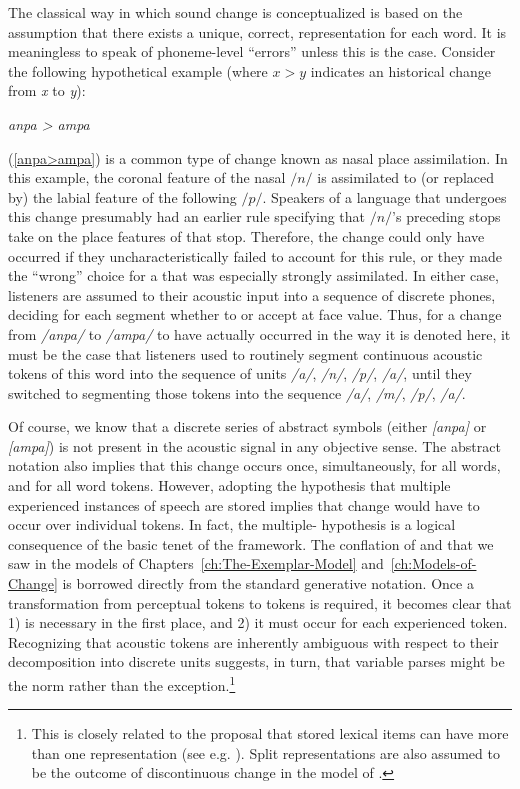 The classical way in which sound change is conceptualized is based
on the assumption that there exists a unique, correct, 
representation for each word. It is meaningless to speak of phoneme-level
“errors” unless this is the case. Consider the following hypothetical
example (where \emph{$x>y$} indicates an historical change from \emph{x}
to \emph{y}):
\begin{covexamples}
\item \label{anpa>ampa}\emph{anpa \textgreater{} ampa}
\end{covexamples}
(\ref{anpa>ampa}) is a common type of change known as nasal place
assimilation. In this example, the coronal feature of the nasal $/n/$
is assimilated to (or replaced by) the labial feature of the following
$/p/$. Speakers of a language that undergoes this change presumably
had an earlier  rule specifying that $/n/$'s preceding
stops take on the place features of that stop. Therefore, the change
could only have occurred if they uncharacteristically failed to account
for this rule, or they made the “wrong” choice for a 
that was especially strongly assimilated. In either case, listeners
are assumed to  their acoustic input into a sequence of discrete
phones, deciding for each segment whether to  or accept at
face value. Thus, for a change from \emph{/anpa/} to \emph{/ampa/}
to have actually occurred in the way it is denoted here, it must be
the case that listeners used to routinely segment continuous acoustic
tokens of this word into the sequence of units \emph{/a/}, \emph{/n/},
\emph{/p/}, \emph{/a/}, until they switched to segmenting
those tokens into the sequence \emph{/a/}, \emph{/m/}, \emph{/p/},
\emph{/a/}. 

Of course, we know that a discrete series of abstract symbols (either
\emph{[anpa]} or \emph{[ampa]}) is not present in the acoustic
signal in any objective sense. The abstract notation also implies
that this change occurs once, simultaneously, for all words, and for
all word tokens. However, adopting the hypothesis that multiple experienced
instances of speech are stored implies that change would have to occur
over individual tokens. In fact, the multiple- hypothesis is
a logical consequence of the basic tenet of the  framework.
The conflation of  and  that we saw in the  models of Chapters~\ref{ch:The-Exemplar-Model} and~\ref{ch:Models-of-Change}
is borrowed directly from the standard generative notation. Once a
transformation from perceptual tokens to  tokens is required,
it becomes clear that 1)  is necessary in the first place,
and 2) it must occur for each experienced token. Recognizing
that acoustic tokens are inherently ambiguous with respect to their
decomposition into discrete units suggests, in turn, that variable
parses might be the norm rather than the exception.\footnote{This is closely related to the proposal that stored lexical items
can have more than one representation (see e.g. \citealp{hooper1976word,Janda2008,Bybee2001}).
Split representations are also assumed to be the outcome of discontinuous
 change in the model of \citet{Garrett2013}.} 

